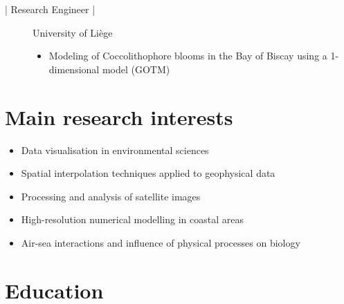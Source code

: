 \documentclass[10pt,a4paper,svgnames]{article}
\begin{document}
\begin{description}
\item[ | Research Engineer |] University of Li\`{e}ge

\begin{itemize}
\item Modeling of Coccolithophore blooms in the Bay of Biscay using a 1-dimensional model (GOTM)
\end{itemize}
\end{description}



\section{Main research interests}

\begin{itemize}
\item {Data visualisation in environmental sciences}
\item {Spatial interpolation techniques applied to geophysical data}
\item {Processing and analysis of satellite images}
\item {High-resolution numerical modelling in coastal areas}
\item {Air-sea interactions and influence of physical processes on biology}
\end{itemize}
%


\section{Education}
\end{document}
